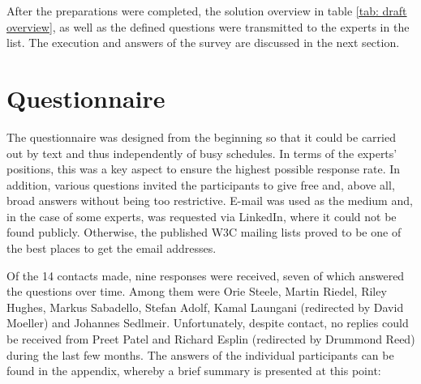     After the preparations were completed, the solution overview in 
    table \ref{tab: draft overview}, as well as the defined questions were transmitted to the experts in the list. The execution and answers of the survey are discussed in the next section.

	\section{Questionnaire}
	The questionnaire was designed from the beginning so that it could be carried out by text and thus independently of busy schedules. In terms of the experts' positions, this was a key aspect to ensure the highest possible response rate. In addition, various questions invited the participants to give free and, above all, broad answers without being too restrictive. E-mail was used as the medium and, in the case of some experts, was requested via LinkedIn, where it could not be found publicly. Otherwise, the published W3C mailing lists proved to be one of the best places to get the email addresses.
	
	Of the 14 contacts made, nine responses were received, seven of which answered the questions over time. Among them were Orie Steele, Martin Riedel, Riley Hughes, Markus Sabadello, Stefan Adolf, Kamal Laungani (redirected by David Moeller) and Johannes Sedlmeir. Unfortunately, despite contact, no replies could be received from Preet Patel and Richard Esplin (redirected by Drummond Reed) during the last few months. The answers of the individual participants can be found in the appendix, whereby a brief summary is presented at this point:
	

